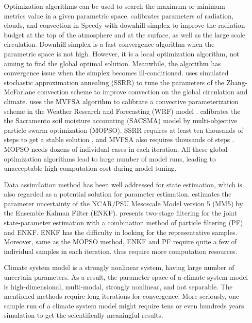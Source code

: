 \documentclass[gmd, manuscript]{copernicus}
\begin{document}
Optimization algorithms can be used to search the maximum or minimum metrics value in a given parametric space. \cite{severijns2005optimizing} calibrates parameters of radiation, clouds, and convection in Speedy with downhill simplex \citep{press1992numerical, nelder1965simplex} to improve the radiation budget at the top of the atmosphere and at the surface, as well as the large scale circulation. Downhill simplex is a fast convergence algorithm when the parametric space is not high. However, it is a local optimization algorithm, not aiming to find the global optimal solution. Meanwhile, the algorithm has convergence issue when the simplex becomes ill-conditioned. \cite{yang2013uncertainty} uses  simulated stochastic approximation annealing (SSRR) \citep{liang2013simulated} to tune the parameters of the Zhang-McFarlane convection scheme to improve convection on the global circulation and climate. \cite{yang2014calibration} uses the MVFSA algorithm to calibrate a convective parameterization scheme in the Weather Research and Forecasting (WRF) model \citep{michalakes2001development}. \cite{gill2006multiobjective} calibrates the the Sacramento soil moisture accounting
(SACSMA) model \citep{Burnash1973} by multi-objective particle swarm optimization (MOPSO). SSRR requires at least ten thousands of steps to get a stable solution \citep{liang2013simulated}, and MVFSA also requires thousands of steps \citep{jackson2004efficient}. MOPSO needs dozens of individual cases in each iteration. All these global optimization algorithms lead to large number of model runs, leading to unacceptable high computation cost during model tuning. 

Data assimilation method has been well addressed for state estimation, which is also regarded as a potential solution for parameter estimation. \cite{aksoy2006ensemble} estimates the parameter uncertainty of  the NCAR/PSU Mesoscale
Model version 5 (MM5) \citep{haagenson1994penn} by the Ensemble Kalman Filter (ENKF). \cite{santiti2013simulated} presents two-stage filtering for the joint state-parameter estimation with a combination method of particle filtering (PF) and ENKF.  ENKF has the difficulty in looking for the representative samples. Moreover, same as the MOPSO method, ENKF and PF require quite a few of individual samples in each iteration, thus require more computation resources. 


Climate system model is a strongly nonlinear system, having large number of uncertain parameters. As a result, the parameter space of a climate system model is high-dimensional, multi-modal, strongly nonlinear, and not separable. The mentioned methods require long iterations for convergence. More seriously, one sample run of a climate system model might require tens or even hundreds years simulation to get the scientifically meaningful results.
\end{document}
